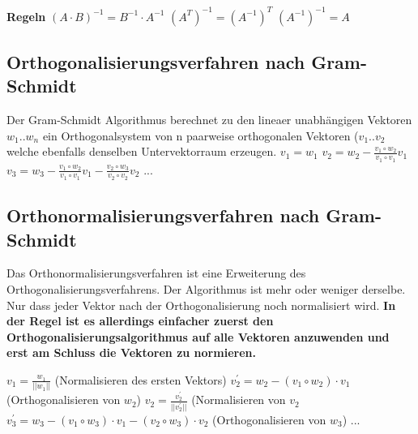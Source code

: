 \documentclass[11pt,a4paper,onecolumn]{article}
\begin{document}
\begin{flushleft}
\textbf{Regeln}\linebreak
$ (A \cdot B)^{-1} = B^{-1} \cdot A^{-1} $\linebreak
$ (A^{T})^{-1} = (A^{-1})^{T}$\linebreak
$ (A^{-1})^{-1} = A $\linebreak


\subsection{Orthogonalisierungsverfahren nach Gram-Schmidt}
Der Gram-Schmidt Algorithmus berechnet zu den lineaer unabhängigen Vektoren $w_{1} .. w_{n} $ ein Orthogonalsystem von n paarweise orthogonalen Vektoren ($v_{1} .. v_{2} $ welche ebenfalls denselben Untervektorraum erzeugen.\linebreak
\linebreak
$ v_{1} = w_{1} $ \linebreak
$ v_{2} = w_{2} - \frac{v_{1} \circ w_{2}}{v_{1} \circ v_{1}} v_{1} $ \linebreak
$ v_{3} = w_{3} - \frac{v_{1} \circ w_{2}}{v_{1} \circ v_{1}} v_{1} - \frac{v_{2} \circ w_{3}}{v_{2} \circ v_{2}} v_{2}$ \linebreak
...
\subsection{Orthonormalisierungsverfahren nach Gram-Schmidt}
Das Orthonormalisierungsverfahren ist eine Erweiterung des Orthogonalisierungsverfahrens. Der Algorithmus ist mehr oder weniger derselbe. Nur dass jeder Vektor nach der Orthogonalisierung noch normalisiert wird.\linebreak
\linebreak
\textbf{In der Regel ist es allerdings einfacher zuerst den Orthogonalisierungsalgorithmus auf alle Vektoren anzuwenden und erst am Schluss die Vektoren zu normieren.}
\linebreak

$ v_ {1} = \frac{w_{1}}{||w_{1}||} $ (Normalisieren des ersten Vektors)\linebreak
$ v^{'}_{2} = w_{2}-(v_{1} \circ w_{2}) \cdot v_{1} $ (Orthogonalisieren von $w_{2}$)\linebreak
$ v_{2} = \frac{v^{'}_{2}}{||v^{'}_{2}||} $ (Normalisieren von $v_{2}$\linebreak
$ v^{'}_{3} = w_{3}-(v_{1} \circ w_{3}) \cdot v_{1} - (v_{2} \circ w_{3}) \cdot v_{2} $ (Orthogonalisieren von $w_{3}$)\linebreak
...


\end{flushleft}
\end{document}
